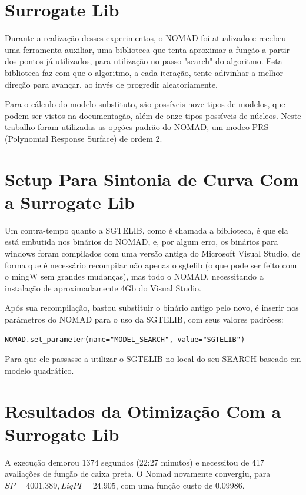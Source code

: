 \section{Surrogate Lib}

Durante a realização desses experimentos, o NOMAD foi atualizado e recebeu uma ferramenta auxiliar, uma biblioteca que tenta aproximar a função a partir dos pontos já utilizados, para utilização no passo "search" do algoritmo. Esta biblioteca faz com que o algoritmo, a cada iteração, tente adivinhar a melhor direção para avançar, ao invés de progredir aleatoriamente.

Para o cálculo do modelo substituto, são possíveis nove tipos de modelos, que podem ser vistos na documentação, além de onze tipos possíveis de núcleos. Neste trabalho foram utilizadas as opções padrão do NOMAD, um modeo PRS (Polynomial Response Surface) de ordem 2.


\section{Setup Para Sintonia de Curva Com a Surrogate Lib}

Um contra-tempo quanto a SGTELIB, como é chamada a biblioteca, é que ela está embutida nos binários do NOMAD, e, por algum erro, os binários para windows foram compilados com uma versão antiga do Microsoft Visual Studio, de forma que é necessário recompilar não apenas o sgtelib (o que pode ser feito com o mingW sem grandes mudanças), mas todo o NOMAD, necessitando a instalação de aproximadamente 4Gb do Visual Studio.

Após sua recompilação, bastou substituir o binário antigo pelo novo, é inserir nos parâmetros do NOMAD para o uso da SGTELIB, com seus valores padrõess:
\begin{verbatim}
NOMAD.set_parameter(name="MODEL_SEARCH", value="SGTELIB")
\end{verbatim}
Para que ele passasse a utilizar o SGTELIB no local do seu SEARCH baseado em modelo quadrático.


\section{Resultados da Otimização Com a Surrogate Lib}

A execução demorou 1374 segundos (22:27 minutos) e necessitou de 417 avaliações de função de caixa preta. O Nomad novamente convergiu, para $SP=4001.389, Liq PI =24.905$, com uma função custo de 0.09986.


